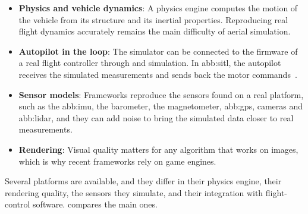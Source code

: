 \begin{itemize}[itemsep=0.5em]
    \item \textbf{Physics and vehicle dynamics}: A physics engine computes the
          motion of the vehicle from its structure and its inertial properties.
          Reproducing real flight dynamics accurately remains the main
          difficulty of aerial simulation.
    \item \textbf{Autopilot in the loop}: The simulator can be connected to the
          firmware of a real flight controller through  and
           simulation. In \gls{abb:sitl}, the autopilot
          receives the simulated measurements and sends back the motor
          commands~\cite{acharya2020cornet}.
    \item \textbf{Sensor models}: Frameworks reproduce the sensors found on a
          real platform, such as the \gls{abb:imu}, the barometer, the
          magnetometer, \gls{abb:gps}, cameras and \gls{abb:lidar}, and they can
          add noise to bring the simulated data closer to real measurements.
    \item \textbf{Rendering}: Visual quality matters for any algorithm that
          works on images, which is why recent frameworks rely on game engines.
\end{itemize}

Several platforms are available, and they differ in their physics engine, their
rendering quality, the sensors they simulate, and their integration with
flight-control software.  compares the main ones.

